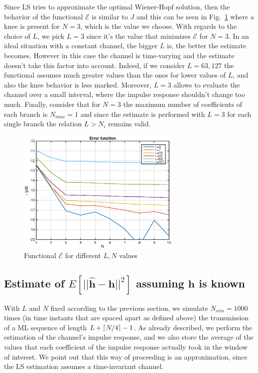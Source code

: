 \documentclass[10pt]{article}
\DeclarePairedDelimiter{\ceil}{\lceil}{\rceil}
\begin{document}
Since LS tries to approximate the optimal Wiener-Hopf solution, then the behavior of the functional $\mathcal{E}$ is similar to $J$ and this can be seen in Fig.~\ref{fig:LN} where a knee is present for $N = 3$, which is the value we choose. With regards to the choice of $L$, we pick $L=3$ since it's the value that minimizes $\mathcal{E}$ for $N=3$. In an ideal situation with a constant channel, the bigger $L$ is, the better the estimate becomes. However in this case the channel is time-varying and the estimate doesn't take this factor into account. Indeed, if we consider $L = 63, 127$ the functional assumes much greater values than the ones for lower values of $L$, and also the knee behavior is less marked. Moreover, $L=3$ allows to evaluate the channel over a small interval, where the impulse response shouldn't change too much. Finally, consider that for $N=3$ the maximum number of coefficients of each branch is $N_{max} = 1$ and since the estimate is performed with $L=3$ for each single branch the relation $L > N_i$ remains valid.

\begin{figure}
  \centering
  \includegraphics[width = 0.7\textwidth]{p02_errfunc}
  \caption{Functional $\mathcal{E}$ for different $L, N$ values}
  \label{fig:LN}
\end{figure}



\subsection*{Estimate of $E[||\mathbf{\hat{h}}-\mathbf{h}||^2]$ assuming $\mathbf{h}$ is known}

With $L$ and $N$ fixed according to the previous section, we simulate $N_{sim}=1000$ times (in time instants that are spaced apart as defined above) the transmission of a ML sequence of length $L+\ceil{N/4} - 1$. As already described, we perform the estimation of the channel's impulse response, and we also store the average of the values that each coefficient of the impulse response actually took in the window of interest. We point out that this way of proceeding is an approximation, since the LS estimation assumes a time-invariant channel.
\end{document}
